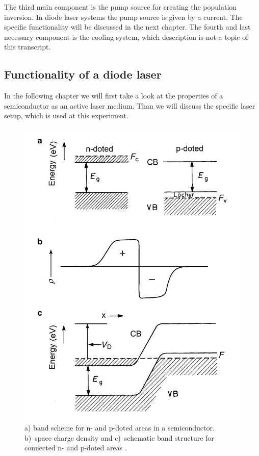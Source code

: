 The third main component is the pump source for creating the
population inversion. In diode laser systems the pump source is given by a
current. The specific functionality will be discussed in the next chapter.
The fourth and last necessary component is the cooling system, which
description is not a topic of this transcript.

\subsection{Functionality of a diode laser}

In the following chapter we will first take a look at the properties of
a semiconductor as an active laser medium. Than we will discuss the specific
laser setup, which is used at this experiment.
\begin{figure}
  \centering
  \includegraphics[width=\textwidth]{Pics/doted.jpg}
  \caption{a) band scheme for n- and p-doted areas in a semiconductor. b)~space
  charge density and c)~schematic band structure for connected n- and
  p-doted areas \cite{eichler}.}
  \label{fig:n_p_doted}
\end{figure}
